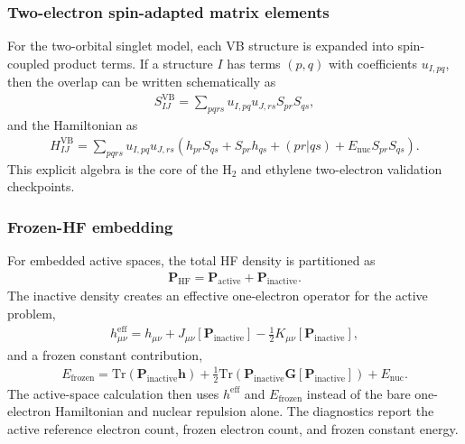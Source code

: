 \documentclass[11pt]{article}
\newcommand{\vb}{\mathrm{VB}}
\begin{document}
\subsubsection*{Two-electron spin-adapted matrix elements}

For the two-orbital singlet model, each VB structure is expanded into spin-coupled product terms.  If a structure $I$ has terms $(p,q)$ with coefficients $u_{I,pq}$, then the overlap can be written schematically as
\begin{equation}
\begin{aligned}
	S_{IJ}^{\vb}
	= \sum_{pqrs} u_{I,pq}u_{J,rs}
	S_{pr}S_{qs},
\end{aligned}
\end{equation}
and the Hamiltonian as
\begin{equation}
\begin{aligned}
	H_{IJ}^{\vb}
	= \sum_{pqrs} u_{I,pq}u_{J,rs}
	\left(
	h_{pr}S_{qs}+S_{pr}h_{qs}+(pr|qs)+E_{\mathrm{nuc}}S_{pr}S_{qs}
	\right).
\end{aligned}
\end{equation}
This explicit algebra is the core of the H$_2$ and ethylene two-electron validation checkpoints.

\subsubsection*{Frozen-HF embedding}

For embedded active spaces, the total HF density is partitioned as
\begin{equation}
\begin{aligned}
	\mathbf{P}_{\mathrm{HF}}
	= \mathbf{P}_{\mathrm{active}}
	+ \mathbf{P}_{\mathrm{inactive}}.
\end{aligned}
\end{equation}
The inactive density creates an effective one-electron operator for the active problem,
\begin{equation}
\begin{aligned}
	h_{\mu\nu}^{\mathrm{eff}}
	= h_{\mu\nu}
	+ J_{\mu\nu}[\mathbf{P}_{\mathrm{inactive}}]
	- \frac{1}{2}K_{\mu\nu}[\mathbf{P}_{\mathrm{inactive}}],
\end{aligned}
\end{equation}
and a frozen constant contribution,
\begin{equation}
\begin{aligned}
	E_{\mathrm{frozen}}
	= \mathrm{Tr}(\mathbf{P}_{\mathrm{inactive}}\mathbf{h})
	+ \frac{1}{2}\mathrm{Tr}\left(\mathbf{P}_{\mathrm{inactive}}\mathbf{G}[\mathbf{P}_{\mathrm{inactive}}]\right)
	+ E_{\mathrm{nuc}}.
\end{aligned}
\end{equation}
The active-space calculation then uses $h^{\mathrm{eff}}$ and $E_{\mathrm{frozen}}$ instead of the bare one-electron Hamiltonian and nuclear repulsion alone.  The diagnostics report the active reference electron count, frozen electron count, and frozen constant energy.
\end{document}
